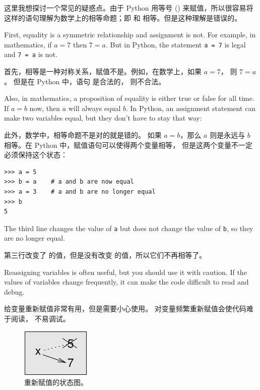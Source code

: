 这里我想探讨一个常见的疑惑点。由于 Python 用等号 (\li{=}) 来赋值，所以很容易将  这样的语句理解为数学上的相等命题；即  和  相等。但是这种理解是错误的。

First, equality is a symmetric relationship and assignment is not.  For
example, in mathematics, if $a=7$ then $7=a$.  But in Python, the
statement {\tt a = 7} is legal and {\tt 7 = a} is not.

首先，相等是一种对称关系，赋值不是。例如，在数学上，如果 $a = 7$，
则 $7 = a$。 但是在 Python 中，语句  是合法的，  则不合法。

Also, in mathematics, a proposition of equality is either true or
false for all time.  If $a=b$ now, then $a$ will always equal $b$.
In Python, an assignment statement can make two variables equal, but
they don't have to stay that way:

此外，数学中，相等命题不是对的就是错的。 如果 $a = b$，那么 $a$
则是永远与 $b$ 相等。在 Python 中，赋值语句可以使得两个变量相等，
但是这两个变量不一定必须保持这个状态：


\begin{lstlisting}
>>> a = 5
>>> b = a    # a and b are now equal
>>> a = 3    # a and b are no longer equal
>>> b
5
\end{lstlisting}

%
The third line changes the value of {\tt a} but does not change the
value of {\tt b}, so they are no longer equal.

第三行改变了  的值，但是没有改变  的值，所以它们不再相等了。

Reassigning variables is often useful, but you should use it
with caution.  If the values of variables change frequently, it can
make the code difficult to read and debug.

给变量重新赋值非常有用，但是需要小心使用。 对变量频繁重新赋值会使代码难于阅读，
不易调试。

\begin{figure}
\centerline
{\includegraphics[scale=0.8]{../source/figs/assign2.pdf}}
\caption {重新赋值的状态图。}
\label{fig.assign2}
\end{figure}



